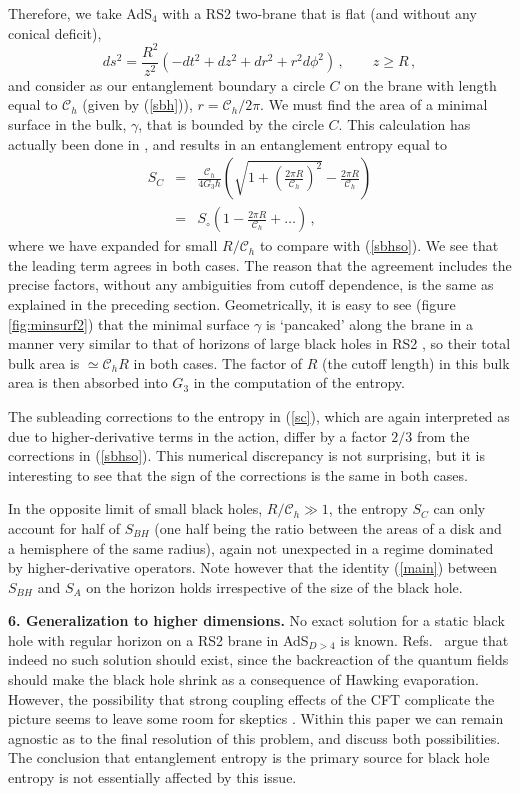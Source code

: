 \documentclass[12pt]{article}
\newcommand{\beq}{\begin{equation}}
\newcommand{\eeq}{\end{equation}}
\newcommand{\beqa}{\begin{eqnarray}}
\newcommand{\eeqa}{\end{eqnarray}}
\newcommand{\reef}[1]{(\ref{#1})}
\begin{document}
Therefore, we take AdS$_4$ with a RS2 two-brane that is flat (and without any
conical deficit), 
\beq
ds^2=\frac{R^2}{z^2}(-dt^2+dz^2+dr^2+r^2 d\phi^2)\,,\qquad z\geq R\,,
\eeq
and consider as our entanglement boundary a circle $C$ on the brane with
length equal to $\mathcal{C}_{h}$ (given by \reef{sbh}),
$r=\mathcal{C}_{h}/2\pi$. We must find the area of a minimal surface in
the bulk, $\gamma$, that is bounded by the circle $C$. This calculation
has actually been done in \cite{ryta}, and results in an entanglement
entropy equal to
\beqa\label{sc}
S_C&=&\frac{\mathcal{C}_{h}}{4G_3\hbar}\left(\sqrt{1+ \left(\frac{2\pi
R}{\mathcal{C}_{h}}\right)^2} -\frac{2\pi
R}{\mathcal{C}_{h}}\right)\nonumber\\
&=&S_{\circ}\left(1-\frac{2\pi R}{\mathcal{C}_{h}}
+\dots
\right)\,,
\eeqa
where we have expanded for small $R/\mathcal{C}_{h}$ to compare with
\reef{sbhso}. We see that the leading term agrees in both cases. The
reason that the agreement includes the precise factors, without any
ambiguities from cutoff dependence, is the same as explained in the
preceding section. Geometrically, it is easy to see (figure
\ref{fig:minsurf2}) that the minimal surface $\gamma$ is `pancaked'
along the brane in a manner very similar to that of horizons of large
black holes in RS2 \cite{ehm1}, so their total bulk area is $\simeq
\mathcal{C}_{h} R$ in both cases. The factor of $R$ (the cutoff length)
in this bulk area is then absorbed into $G_3$ in the computation of the
entropy.

The subleading corrections to the entropy in \reef{sc}, which are again
interpreted as due to higher-derivative terms in the action, differ by a
factor $2/3$ from the corrections in \reef{sbhso}. This numerical
discrepancy is not surprising, but it is interesting to see that the
sign of the corrections is the same in both cases. 

In the opposite limit of small black holes, $R/\mathcal{C}_{h}\gg 1$,
the entropy $S_C$ can only account for half of $S_{BH}$ (one half being
the ratio between the areas of a disk and a hemisphere of the same
radius), again not unexpected in a regime dominated by
higher-derivative operators. Note however that the identity \reef{main}
between $S_{BH}$ and $S_{A}$ on the horizon holds irrespective of the
size of the black hole.


\bigskip

\noindent\textbf{6. Generalization to higher dimensions.} No exact
solution for a static black hole with regular horizon on a RS2 brane in
AdS$_{D>4}$ is known. Refs.~\cite{tanaka,efk} argue that indeed no such
solution should exist, since the backreaction of the quantum fields
should make the black hole shrink as a consequence of Hawking
evaporation. However, the possibility that strong coupling effects of
the CFT complicate the picture seems to leave some room for skeptics
\cite{rob}. Within this paper we can remain agnostic as to the final
resolution of this problem, and discuss both possibilities. The
conclusion that entanglement entropy is the primary source for black
hole entropy is not essentially affected by this issue.
\end{document}
